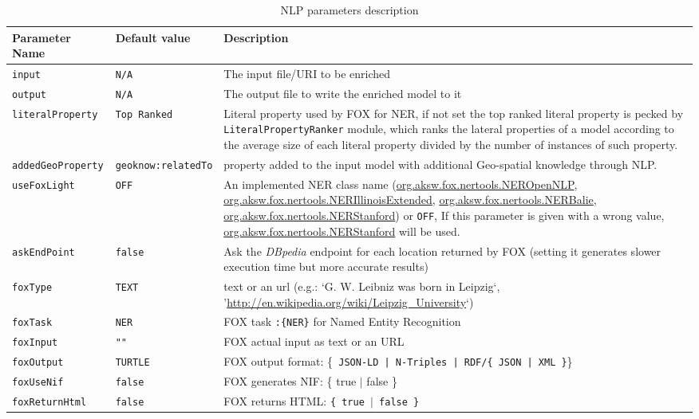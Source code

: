 \documentclass[a4paper,twoside,bibtotoc,abstracton,12pt,BCOR=15mm]{article}
\begin{document}
\begin{table}

\caption{NLP parameters description} \label{tbl:nlpPram}
\footnotesize
\begin{tabularx}{\textwidth}{@{}llX@{}}
\toprule
\textbf{Parameter Name} & \textbf{Default value} & \textbf{Description}\\
\midrule
\texttt{input} 		& \texttt{N/A} 		& The input file/URI to be enriched\\
\texttt{output} 	& \texttt{N/A} 		& The output file to write the enriched model to it\\
\texttt{literalProperty}	& \texttt{Top Ranked} 	& Literal property used by FOX for NER, if not set the top ranked literal property is pecked by \texttt{LiteralPropertyRanker} module, which ranks the  lateral properties of a model according to the average size of each literal property divided by the number of instances of such property.\\
\texttt{addedGeoProperty}& \texttt{geoknow:relatedTo\footnotemark[11]}& property added to the input model with additional Geo-spatial knowledge through NLP.\\
\texttt{useFoxLight} 	& \texttt{OFF} 	& An implemented NER class name (\url{org.aksw.fox.nertools.NEROpenNLP}, \url{org.aksw.fox.nertools.NERIllinoisExtended}, \url{org.aksw.fox.nertools.NERBalie}, \url{org.aksw.fox.nertools.NERStanford}) or \texttt{OFF}, If this parameter is given with a wrong value, \url{org.aksw.fox.nertools.NERStanford} will be used. \\
\texttt{askEndPoint} 	& \texttt{false} 	& Ask the \emph{DBpedia} endpoint for each location returned by FOX (setting it generates slower execution time but more accurate results)\\
\texttt{foxType} 	& \texttt{TEXT} 	&  text or an url (e.g.: `G. W. Leibniz was born in Leipzig`, '\url{http://en.wikipedia.org/wiki/Leipzig_University}`) \\
\texttt{foxTask} 	& \texttt{NER} 		& FOX task \texttt{:\{NER\}} for Named Entity Recognition\\
\texttt{foxInput} 	& \texttt{""} 		& FOX actual input as text or an URL\\
\texttt{foxOutput} 	& \texttt{TURTLE} 	& FOX output format: \{\texttt{ JSON-LD | N-Triples | RDF/\{ JSON | XML \}}\}\\
\texttt{foxUseNif} 	& \texttt{false} 	& FOX generates NIF: \{ true $\rvert$ false \}\\
\texttt{foxReturnHtml} & \texttt{false} 	& FOX returns HTML: \texttt{\{ true $\rvert$ false \}}\\ 
\bottomrule
\end{tabularx}
\end{table}
\end{document}
